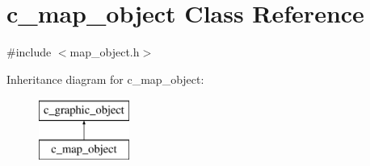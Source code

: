 \hypertarget{classc__map__object}{\section{c\-\_\-map\-\_\-object Class Reference}
\label{classc__map__object}
}


{\ttfamily \#include $<$map\-\_\-object.\-h$>$}

Inheritance diagram for c\-\_\-map\-\_\-object\-:\begin{figure}[H]
\begin{center}
\leavevmode
\includegraphics[height=2.000000cm]{classc__map__object}
\end{center}
\end{figure}
